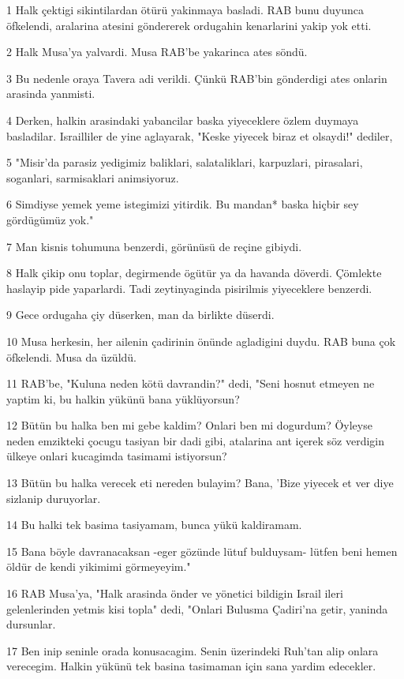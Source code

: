 \par 1 Halk çektigi sikintilardan ötürü yakinmaya basladi. RAB bunu duyunca öfkelendi, aralarina atesini göndererek ordugahin kenarlarini yakip yok etti.
\par 2 Halk Musa'ya yalvardi. Musa RAB'be yakarinca ates söndü.
\par 3 Bu nedenle oraya Tavera adi verildi. Çünkü RAB'bin gönderdigi ates onlarin arasinda yanmisti.
\par 4 Derken, halkin arasindaki yabancilar baska yiyeceklere özlem duymaya basladilar. Israilliler de yine aglayarak, "Keske yiyecek biraz et olsaydi!" dediler,
\par 5 "Misir'da parasiz yedigimiz baliklari, salataliklari, karpuzlari, pirasalari, soganlari, sarmisaklari animsiyoruz.
\par 6 Simdiyse yemek yeme istegimizi yitirdik. Bu mandan* baska hiçbir sey gördügümüz yok."
\par 7 Man kisnis tohumuna benzerdi, görünüsü de reçine gibiydi.
\par 8 Halk çikip onu toplar, degirmende ögütür ya da havanda döverdi. Çömlekte haslayip pide yaparlardi. Tadi zeytinyaginda pisirilmis yiyeceklere benzerdi.
\par 9 Gece ordugaha çiy düserken, man da birlikte düserdi.
\par 10 Musa herkesin, her ailenin çadirinin önünde agladigini duydu. RAB buna çok öfkelendi. Musa da üzüldü.
\par 11 RAB'be, "Kuluna neden kötü davrandin?" dedi, "Seni hosnut etmeyen ne yaptim ki, bu halkin yükünü bana yüklüyorsun?
\par 12 Bütün bu halka ben mi gebe kaldim? Onlari ben mi dogurdum? Öyleyse neden emzikteki çocugu tasiyan bir dadi gibi, atalarina ant içerek söz verdigin ülkeye onlari kucagimda tasimami istiyorsun?
\par 13 Bütün bu halka verecek eti nereden bulayim? Bana, 'Bize yiyecek et ver diye sizlanip duruyorlar.
\par 14 Bu halki tek basima tasiyamam, bunca yükü kaldiramam.
\par 15 Bana böyle davranacaksan -eger gözünde lütuf bulduysam- lütfen beni hemen öldür de kendi yikimimi görmeyeyim."
\par 16 RAB Musa'ya, "Halk arasinda önder ve yönetici bildigin Israil ileri gelenlerinden yetmis kisi topla" dedi, "Onlari Bulusma Çadiri'na getir, yaninda dursunlar.
\par 17 Ben inip seninle orada konusacagim. Senin üzerindeki Ruh'tan alip onlara verecegim. Halkin yükünü tek basina tasimaman için sana yardim edecekler.
